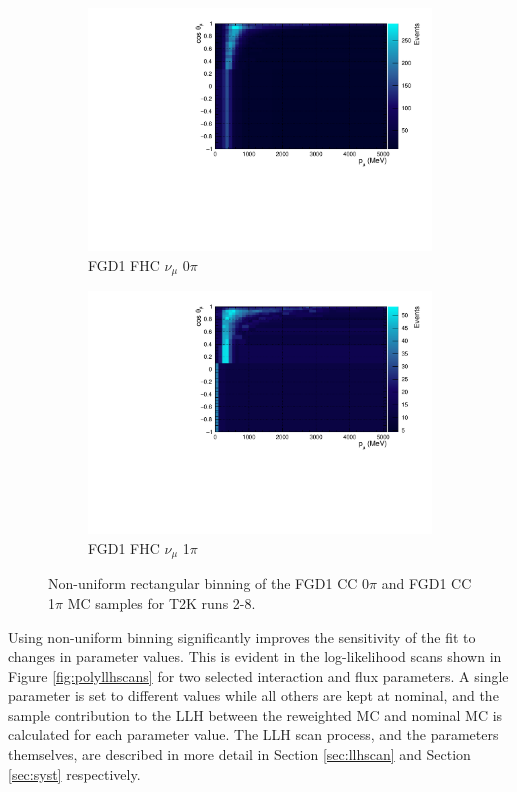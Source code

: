 \begin{figure}
\centering
\begin{subfigure}{.49\textwidth}
  \centering
  \includegraphics[width=0.95\linewidth]{figs/TH2Poly_MC_FGD1_numuCC_0pi}
  \caption{FGD1 FHC $\nu_{\mu}$ 0$\pi$}
  \label{fig:th2polyFGD1_numuCC_0pi}
\end{subfigure}
\begin{subfigure}{.49\textwidth}
  \centering
  \includegraphics[width=0.95\linewidth]{figs/TH2Poly_MC_FGD1_numuCC_1pi}
  \caption{FGD1 FHC $\nu_{\mu}$ 1$\pi$}
  \label{fig:th2polyFGD1_numuCC_1pi}
\end{subfigure}
\caption{Non-uniform rectangular binning of the FGD1 CC 0$\pi$ and FGD1 CC 1$\pi$ MC samples for T2K runs 2-8.}
\label{fig:th2polybin}
\end{figure}

Using non-uniform binning significantly improves the sensitivity of the fit to changes in parameter values. This is evident in the log-likelihood scans shown in Figure \ref{fig:polyllhscans} for two selected interaction and flux parameters. A single parameter is set to different values while all others are kept at nominal, and the sample contribution to the LLH between the reweighted MC and nominal MC is calculated for each parameter value. The LLH scan process, and the parameters themselves, are described in more detail in Section \ref{sec:llhscan} and Section \ref{sec:syst} respectively.

